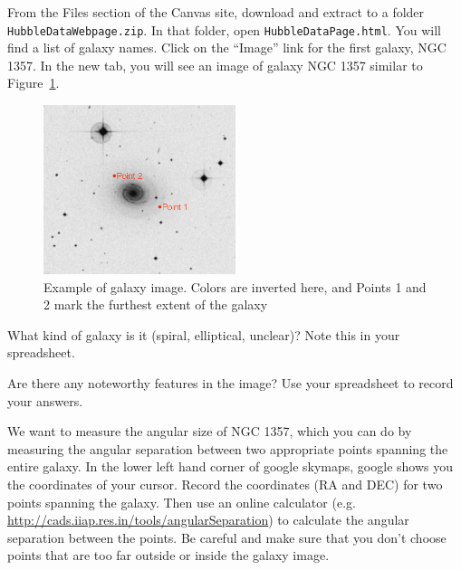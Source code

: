 From the Files section of the Canvas site, download and extract to a folder \texttt{HubbleDataWebpage.zip}. In that folder, open \texttt{HubbleDataPage.html}. You
will find a list of galaxy names. Click on the ``Image'' link for the first
galaxy, NGC 1357. In the new tab, you will see an image of galaxy NGC
1357 similar to Figure~\ref{hd:fig:galaxy-example}.

\begin{figure}
	\centering
	\includegraphics[width=0.5\textwidth]{hubble-diagram/galaxy-example}
	\caption{Example of galaxy image. Colors are inverted here, and Points 1 and 2 mark the furthest extent of the galaxy}\label{hd:fig:galaxy-example}
\end{figure}

\begin{steps}
	\item\label{hd:step:kind} What kind of galaxy is it (spiral, elliptical, unclear)? Note this in your spreadsheet.
	
	\item Are there any noteworthy features in the image? Use your spreadsheet to record your answers.
\end{steps}

We want to measure the angular size of NGC 1357, which you can do by
measuring the angular separation between two appropriate points
spanning the entire galaxy. In the lower left hand corner of google
skymaps, google shows you the coordinates of your cursor. Record the
coordinates (RA and DEC) for two points spanning the galaxy. Then use
an online calculator (e.g.
\url{http://cads.iiap.res.in/tools/angularSeparation}) to calculate the
angular separation between the points. Be careful and make sure that you don’t choose points that are too far
outside or inside the galaxy image.

